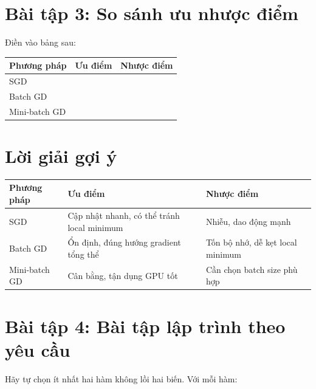 \documentclass[12pt,a4paper]{report}
\begin{document}
\section*{Bài tập 3: So sánh ưu nhược điểm}

Điền vào bảng sau:

\begin{center}
\begin{tabular}{p{}p{}p{}}
\toprule
Phương pháp & Ưu điểm & Nhược điểm \\
\midrule
SGD &  &  \\
Batch GD &  &  \\
Mini-batch GD &  &  \\
\bottomrule
\end{tabular}
\end{center}

\section*{Lời giải gợi ý}

\begin{center}
\begin{tabular}{p{}p{}p{}}
\toprule
Phương pháp & Ưu điểm & Nhược điểm \\
\midrule
SGD & Cập nhật nhanh, có thể tránh local minimum & Nhiễu, dao động mạnh \\
Batch GD & Ổn định, đúng hướng gradient tổng thể & Tốn bộ nhớ, dễ kẹt local minimum \\
Mini-batch GD & Cân bằng, tận dụng GPU tốt & Cần chọn batch size phù hợp \\
\bottomrule
\end{tabular}
\end{center}

\section*{Bài tập 4: Bài tập lập trình theo yêu cầu}

Hãy tự chọn ít nhất hai hàm không lồi hai biến. Với mỗi hàm:
\end{document}
